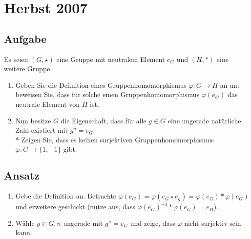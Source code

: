 \section{Herbst 2007}

\subsection{Aufgabe}
Es seien \( (G, \star) \) eine Gruppe mit neutralem Element \( e_G \) und \( (H, *) \) eine weitere Gruppe.
\begin{enumerate}
	\item Geben Sie die Definition eines Gruppenhomomorphismus \( \varphi: G \to H \) an unt beweisen Sie, dass für solche einen Gruppenhomomorphismus \( \varphi(e_G) \) das neutrale Element von \( H \) ist.
	\item Nun besitze \( G \) die Eigenschaft, dass für alle \( g \in G \) eine ungerade natürliche Zahl existiert mit \( g^n = e_G \). \\* Zeigen Sie, dass es keinen surjektiven Gruppenhomomorphismus \( \varphi: G \to \{ 1, -1 \} \) gibt. 
\end{enumerate}

\subsection{Ansatz}
\begin{enumerate}
	\item Gebe die Definition an. Betrachte \( \varphi(e_G) = \varphi(e_G \star e_g) = \varphi(e_G) * \varphi(e_G) \) und erweitere geschickt (nutze aus, dass \( \varphi(e_G)^{-1} * \varphi(e_G) = e_H \)).
	\item Wähle \( g \in G, n \) ungerade mit \( g^n = e_G \) und zeige, dass \( \varphi \) nicht surjektiv sein kann.
\end{enumerate}

